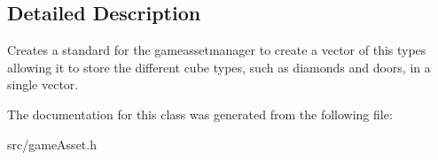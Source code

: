 \subsection{Detailed Description}
Creates a standard for the gameassetmanager to create a vector of this types allowing it to store the different cube types, such as diamonds and doors, in a single vector. 

The documentation for this class was generated from the following file\-:\begin{DoxyCompactItemize}
\item 
src/game\-Asset.\-h\end{DoxyCompactItemize}

